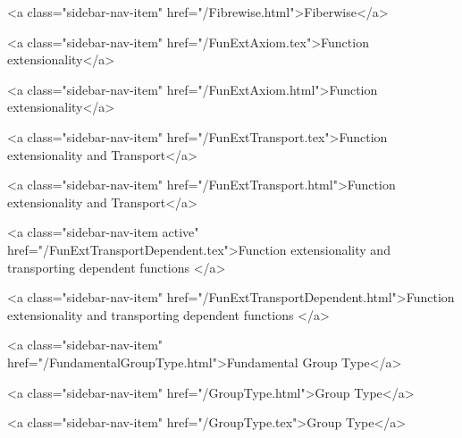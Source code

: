       
    
      
        
          <a class="sidebar-nav-item" href="/Fibrewise.html">Fiberwise</a>
        
      
    
      
        
          <a class="sidebar-nav-item" href="/FunExtAxiom.tex">Function extensionality</a>
        
      
    
      
        
          <a class="sidebar-nav-item" href="/FunExtAxiom.html">Function extensionality</a>
        
      
    
      
        
          <a class="sidebar-nav-item" href="/FunExtTransport.tex">Function extensionality and Transport</a>
        
      
    
      
        
          <a class="sidebar-nav-item" href="/FunExtTransport.html">Function extensionality and Transport</a>
        
      
    
      
        
          <a class="sidebar-nav-item active" href="/FunExtTransportDependent.tex">Function extensionality and transporting dependent functions </a>
        
      
    
      
        
          <a class="sidebar-nav-item" href="/FunExtTransportDependent.html">Function extensionality and transporting dependent functions </a>
        
      
    
      
        
          <a class="sidebar-nav-item" href="/FundamentalGroupType.html">Fundamental Group Type</a>
        
      
    
      
        
          <a class="sidebar-nav-item" href="/GroupType.html">Group Type</a>
        
      
    
      
        
          <a class="sidebar-nav-item" href="/GroupType.tex">Group Type</a>
        
      
    
